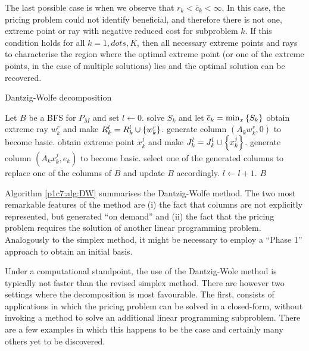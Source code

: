 The last possible case is when we observe that $r_k < \overline{c}_k < \infty$. In this case, the pricing problem could not identify beneficial, and therefore there is not one, extreme point or ray with negative reduced cost for subproblem $k$. If this condition holds for all $k = 1, dots, K$, then all necessary extreme points and rays to characterise the region where the optimal extreme point (or one of the extreme points, in the case of multiple solutions) lies and the optimal solution can be recovered. 

\begin{algorithm}[h]
\caption{Dantzig-Wolfe decomposition} \label{p1c7:alg:DW}
\begin{algorithmic}[1] %
	Let $B$ be a BFS for $P_M$ and set $l \gets 0$. 
	\Repeat 
	        \State solve $S_k$ and let $\overline{c}_k = \min_x \left\{ S_k \right \}$
	        	\State obtain extreme ray $w_k^r$ and make $R_k^l = R_k^l \cup \left\{ w_k^r \right \}$.
	        	\State generate column $(A_kw_k^r, 0)$ to become basic.
	        	\State obtain extreme point $x_k^j$ and make $J_k^l = J_k^l \cup \left\{ x_k^j \right \}$.
	        	\State generate column $(A_kx_k^j, e_k)$ to become basic.
	        \EndIf  
	    \EndFor
			\State select one of the generated columns to replace one of the columns of $B$ and update $B$ accordingly. 
	    \State $l \gets l + 1$.            	
	 $B$
\end{algorithmic}  
\end{algorithm}

Algorithm \ref{p1c7:alg:DW} summarises the Dantzig-Wolfe method. The two most remarkable features of the method are (i) the fact that columns are not explicitly represented, but generated ``on demand'' and (ii) the fact that the pricing problem requires the solution of another linear programming problem. Analogously to the simplex method, it might be necessary to employ a ``Phase 1'' approach to obtain an initial basis.

Under a computational standpoint, the use of the Dantzig-Wole method is typically not faster than the revised simplex method. There are however two settings where the decomposition is most favourable. The first, consists of applications in which the pricing problem can be solved in a closed-form, without invoking a method to solve an additional linear programming subproblem. There are a few examples in which this happens to be the case and certainly many others yet to be discovered.

